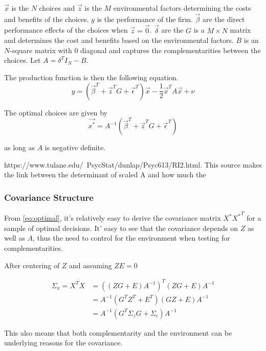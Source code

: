 \documentclass[]{article} %
\begin{document}
$\vec{x}$ is the $N$ choices and $\vec{z}$ is the $M$ environmental factors determining the costs and benefits of the choices. $y$ is the performance of the firm. $\vec{\beta}$ are the direct performance effects of the choices when $\vec{z} = \vec{0}$. $\vec{\delta}$ are the 
$G$ is a $M \times N$ matrix and determines the cost and benefits based on the environmental factors. $B$ is an $N$-square matrix with $0$ diagonal and captures the complementarities between the choices. Let $A = \delta^T I_N - B$. 

The production function is then the following equation.
\begin{equation}
\label{eq:production}
    y = (\vec{\beta}^T + \vec{z}^T G + \vec{\epsilon}^T) \vec{x} 
         - \frac{1}{2} \vec{x}^T A \vec{x} + \nu
\end{equation}

The optimal choices are given by 
\begin{equation}
\label{eq:optimal}
    \vec{x^*} = A^{-1}(\vec{\beta}^T + \vec{z}^T G + \vec{\epsilon}^T) 
\end{equation}

as long as $A$ is negative definite.

https://www.tulane.edu/~PsycStat/dunlap/Psyc613/RI2.html. This source makes the link between the determinant of scaled A and how much the 

\subsubsection{Covariance Structure}
From \ref{eq:optimal}, it's relatively easy to derive the covariance matrix
$X^*{X^{*}}^T$ for a sample of optimal decisions. It' easy to see that the covariance depends on $Z$ as well as $A$, thus the need to control for the environment when testing 
for complementarities.

After centering of $Z$ and assuming $Z E = 0$

\begin{align}
\Sigma_x = X^TX 
     &= ((Z G + E)A^{-1})^T (Z G + E)A^{-1} \nonumber \\
     &= A^{-1} (G^T Z^T + E^T) (G Z + E) A^{-1} \nonumber \\
     &= A^{-1} (G^T \Sigma_z G + \Sigma_{\epsilon}) A^{-1} \label{eq:covariance}
\end{align}

This also means that both complementarity and the environment can be underlying reasons for the covariance. 
\end{document}
